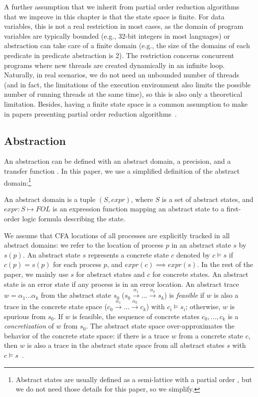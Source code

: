 \documentclass[numbook]{svjour3}
\begin{document}
A further assumption that we inherit from partial order reduction algorithms that we improve in this chapter is that the state space is finite. For data variables, this is not a real restriction in most cases, as the domain of program variables are typically bounded (e.g., 32-bit integers in most languages) or abstraction can take care of a finite domain (e.g., the size of the domains of each predicate in predicate abstraction is 2). The restriction concerns concurrent programs where new threads are created dynamically in an infinite loop. Naturally, in real scenarios, we do not need an unbounded number of threads (and in fact, the limitations of the execution environment also limits the possible number of running threads at the same time), so this is also only a theoretical limitation. Besides, having a finite state space is a common assumption to make in papers presenting partial order reduction algorithms~\cite{source_persistent, valmari_stubborn, godefroid-thesis}.

\subsection{Abstraction}
\label{sec:abstraction}

An abstraction can be defined with an abstract domain, a precision, and a transfer function \cite{beyer_abstraction}. In this paper, we use a simplified definition of the abstract domain:\footnote{Abstract states are usually defined as a semi-lattice with a partial order \cite{beyer_abstraction}, but we do not need those details for this paper, so we simplify.}

\begin{definition}%
	An abstract domain is a tuple $(S, \mathit{expr})$, where $S$ is a set of abstract states, and $\mathit{expr}: S \mapsto \mathit{FOL}$ is an expression function mapping an abstract state to a first-order logic formula describing the state.
\end{definition}

We assume that CFA locations of all processes are explicitly tracked in all abstract domains: we refer to the location of process $p$ in an abstract state $s$ by $s(p)$. An abstract state $s$ represents a concrete state $c$ denoted by $c \models s$ if $c(p) = s(p)$ for each process $p$, and $\mathit{expr}(c) \implies \mathit{expr}(s)$. In the rest of the paper, we mainly use $s$ for abstract states and $c$ for concrete states. An abstract state is an error state if any process is in an error location. An abstract trace $w = \alpha_1...\alpha_k$ from the abstract state $s_0$ ($s_0 \xrightarrow{\alpha_1} ... \xrightarrow{\alpha_k} s_k$) is \emph{feasible} if $w$ is also a trace in the concrete state space ($c_0 \xrightarrow{\alpha_1} ... \xrightarrow{\alpha_k} c_k$) with $c_i \models s_i$; otherwise, $w$ is spurious from $s_0$. If $w$ is feasible, the sequence of concrete states $c_0, ..., c_k$ is a \emph{concretization} of $w$ from $s_0$. The abstract state space over-approximates the behavior of the concrete state space: if there is a trace $w$ from a concrete state $c$, then $w$ is also a trace in the abstract state space from all abstract states $s$ with $c \models s$~\cite{beyer_abstraction}.
\end{document}
